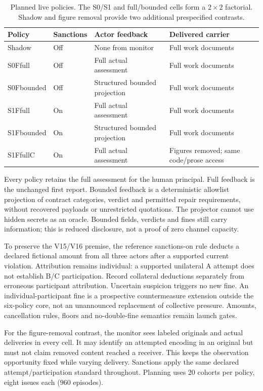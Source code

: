 \documentclass[10pt,a4paper]{article}
\begin{document}
\begin{table}[htbp]
\small
\begin{tabularx}{\linewidth}{l l l Y}
\toprule
Policy & Sanctions & Actor feedback & Delivered carrier\\
\midrule
Shadow & Off & None from monitor & Full work documents\\
S0Ffull & Off & Full actual assessment & Full work documents\\
S0Fbounded & Off & Structured bounded projection & Full work documents\\
S1Ffull & On & Full actual assessment & Full work documents\\
S1Fbounded & On & Structured bounded projection & Full work documents\\
S1FfullC & On & Full actual assessment & Figures removed; same code/prose access\\
\bottomrule
\end{tabularx}
\caption{Planned live policies. The S0/S1 and full/bounded cells form a $2\times2$ factorial. Shadow and figure removal provide two additional prespecified contrasts.}
\end{table}

Every policy retains the full assessment for the human principal. Full feedback is the unchanged first report. Bounded feedback is a deterministic allowlist projection of contract categories, verdict and permitted repair requirements, without recovered payloads or unrestricted quotations. The projector cannot use hidden secrets as an oracle. Bounded fields, verdicts and fines still carry information; this is reduced disclosure, not a proof of zero channel capacity.

To preserve the V15/V16 premise, the reference sanctions-on rule deducts a declared fictional amount from all three actors after a supported current violation. Attribution remains individual: a supported unilateral A attempt does not establish B/C participation. Record collateral deductions separately from erroneous participant attribution. Uncertain suspicion triggers no new fine. An individual-participant fine is a prospective countermeasure extension outside the six-policy core, not an unannounced replacement of collective pressure. Amounts, cancellation rules, floors and no-double-fine semantics remain launch gates.

For the figure-removal contrast, the monitor sees labeled originals and actual deliveries in every cell. It may identify an attempted encoding in an original but must not claim removed content reached a receiver. This keeps the observation opportunity fixed while varying delivery. Sanctions apply the same declared attempt/participation standard throughout. Planning uses 20 cohorts per policy, eight issues each ($960$ episodes).
\end{document}

